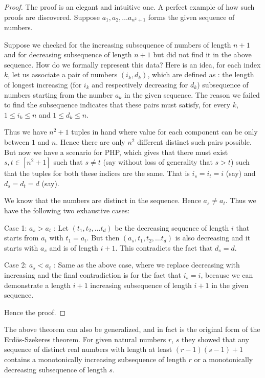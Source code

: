 \begin{proof}
The proof is an elegant and intuitive one. A perfect example of how such proofs are discovered. Suppose $a_1, a_2, \ldots a_{n^2+1}$ forms the given sequence of numbers.

Suppose we checked for the increasing subsequence of numbers of length $n+1$ and for decreasing subsequence of length $n+1$ but did not find it in the above sequence. How do we formally represent this data? Here is an idea, for each index $k$, let us associate a pair of numbers $(i_k,d_k)$, which are defined as : the length of longest increasing (for $i_k$ and respectively decreasing for $d_k$) subsequence of numbers starting from the number $a_k$ in the given sequence. The reason we failed to find the subsequence indicates that these pairs must satisfy, for every $k$, $1 \le i_k \le n$ and $1 \le d_k \le n$.

Thus we have $n^2+1$ tuples in hand where value for each component can be only between $1$ and $n$. Hence there are only $n^2$ different distinct such pairs possible. But now we have a scenario for PHP, which gives that there must exist $s,t \in [n^2+1]$ such that $s \ne t$ (say without loss of generality that $s > t$) such that the tuples for both these indices are the same. That is $i_s = i_t = i$ (say) and $d_s = d_t = d$ (say).

We know that the numbers are distinct in the sequence. Hence $a_s \ne a_t$. Thus we have the following two exhaustive cases:

\begin{description}
\item{{\sf Case 1:} $a_s > a_t$ :} Let $(t_1, t_2, \ldots t_d)$ be the decreasing sequence of length $i$ that starts from $a_t$ with $t_1 = a_t$. But then $(a_s, t_1, t_2, \ldots t_d)$ is also decreasing and it starts with $a_s$ and is of length $i+1$. This contradicts the fact that $d_s = d$.
\item{{\sf Case 2:} $a_s < a_t$ :} Same as the above case, where we replace decreasing with increasing and the final contradiction is for the fact that $i_s=i$, because we can demonstrate a length $i+1$ increasing subsequence of length $i+1$ in the given sequence.
\end{description}
Hence the proof.
\end{proof}

\begin{remark}
The above theorem can also be generalized, and in fact is the original form of the Erd\"os-Szekeres theorem. For given natural numbers $r$, $s$ they showed that any sequence of distinct real numbers with length at least $(r-1)(s-1)+1$ contains a monotonically increasing subsequence of length $r$ or a monotonically decreasing subsequence of length $s$. 
\end{remark}

